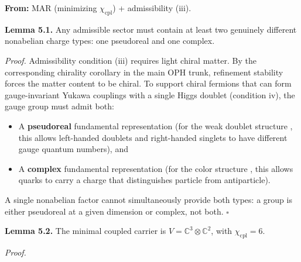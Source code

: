\textbf{From:} MAR (minimizing \(\chi_{\mathrm{cpl}}\)) + admissibility (iii).

\textbf{Lemma 5.1.} Any admissible sector must contain at least two genuinely different nonabelian charge types: one pseudoreal and one complex.

\emph{Proof.} Admissibility condition (iii) requires light chiral matter. By the corresponding chirality corollary in the main OPH trunk, refinement stability forces the matter content to be chiral. To support chiral fermions that can form gauge-invariant Yukawa couplings with a single Higgs doublet (condition iv), the gauge group must admit both:

\begin{itemize}
\tightlist
\item
  A \textbf{pseudoreal} fundamental representation (for the weak doublet structure , this allows left-handed doublets and right-handed singlets to have different gauge quantum numbers), and
\item
  A \textbf{complex} fundamental representation (for the color structure , this allows quarks to carry a charge that distinguishes particle from antiparticle).
\end{itemize}

A single nonabelian factor cannot simultaneously provide both types: a group is either pseudoreal at a given dimension or complex, not both. \(\square\)

\textbf{Lemma 5.2.} The minimal coupled carrier is \(V = \mathbb{C}^3 \otimes \mathbb{C}^2\), with \(\chi_{\mathrm{cpl}} = 6\).

\emph{Proof.}

